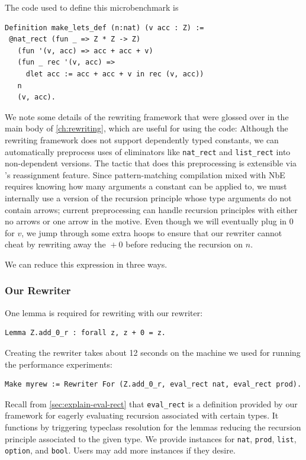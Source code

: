 \begin{subappendices}
The code used to define this microbenchmark is
\begin{verbatim}
Definition make_lets_def (n:nat) (v acc : Z) :=
 @nat_rect (fun _ => Z * Z -> Z)
   (fun '(v, acc) => acc + acc + v)
   (fun _ rec '(v, acc) =>
     dlet acc := acc + acc + v in rec (v, acc))
   n
   (v, acc).
\end{verbatim}
We note some details of the rewriting framework that were glossed over in the main body of \autoref{ch:rewriting}, which are useful for using the code:
Although the rewriting framework does not support dependently typed constants, we can automatically preprocess uses of eliminators like \texttt{nat_rect} and \texttt{list_rect} into non-dependent versions.
The tactic that does this preprocessing is extensible via \Ltac{}'s reassignment feature.
Since pattern-matching compilation mixed with NbE requires knowing how many arguments a constant can be applied to, we must internally use a version of the recursion principle whose type arguments do not contain arrows; current preprocessing can handle recursion principles with either no arrows or one arrow in the motive.
Even though we will eventually plug in 0 for $v$, we jump through some extra hoops to ensure that our rewriter cannot cheat by rewriting away the ${}+0$ before reducing the recursion on $n$.

We can reduce this expression in three ways.

\subsubsection{Our Rewriter}
One lemma is required for rewriting with our rewriter:
\begin{verbatim}
Lemma Z.add_0_r : forall z, z + 0 = z.
\end{verbatim}

Creating the rewriter takes about 12 seconds on the machine we used for running the performance experiments:
\begin{verbatim}
Make myrew := Rewriter For (Z.add_0_r, eval_rect nat, eval_rect prod).
\end{verbatim}
Recall from \autoref{sec:explain-eval-rect} that \texttt{eval_rect} is a definition provided by our framework for eagerly evaluating recursion associated with certain types.
It functions by triggering typeclass resolution for the lemmas reducing the recursion principle associated to the given type.
We provide instances for \texttt{nat}, \texttt{prod}, \texttt{list}, \texttt{option}, and \texttt{bool}.
Users may add more instances if they desire.


\end{subappendices}
